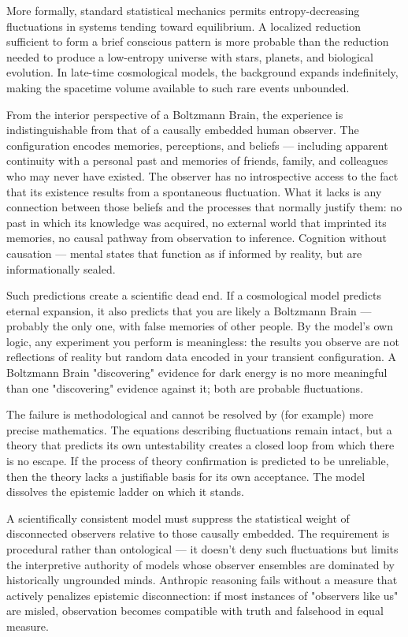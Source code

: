 More formally, standard statistical mechanics permits entropy-decreasing fluctuations in systems tending toward equilibrium. A localized reduction sufficient to form a brief conscious pattern is more probable than the reduction needed to produce a low-entropy universe with stars, planets, and biological evolution. In late-time cosmological models, the background expands indefinitely, making the spacetime volume available to such rare events unbounded.

From the interior perspective of a Boltzmann Brain, the experience is indistinguishable from that of a causally embedded human observer. The configuration encodes memories, perceptions, and beliefs — including apparent continuity with a personal past and memories of friends, family, and colleagues who may never have existed. The observer has no introspective access to the fact that its existence results from a spontaneous fluctuation. What it lacks is any connection between those beliefs and the processes that normally justify them: no past in which its knowledge was acquired, no external world that imprinted its memories, no causal pathway from observation to inference. Cognition without causation — mental states that function as if informed by reality, but are informationally sealed.

Such predictions create a scientific dead end. If a cosmological model predicts eternal expansion, it also predicts that you are likely a Boltzmann Brain — probably the only one, with false memories of other people. By the model's own logic, any experiment you perform is meaningless: the results you observe are not reflections of reality but random data encoded in your transient configuration. A Boltzmann Brain "discovering" evidence for dark energy is no more meaningful than one "discovering" evidence against it; both are probable fluctuations.

The failure is methodological and cannot be resolved by (for example) more precise mathematics. The equations describing fluctuations remain intact, but a theory that predicts its own untestability creates a closed loop from which there is no escape. If the process of theory confirmation is predicted to be unreliable, then the theory lacks a justifiable basis for its own acceptance. The model dissolves the epistemic ladder on which it stands.

A scientifically consistent model must suppress the statistical weight of disconnected observers relative to those causally embedded. The requirement is procedural rather than ontological — it doesn't deny such fluctuations but limits the interpretive authority of models whose observer ensembles are dominated by historically ungrounded minds. Anthropic reasoning fails without a measure that actively penalizes epistemic disconnection: if most instances of "observers like us" are misled, observation becomes compatible with truth and falsehood in equal measure.

